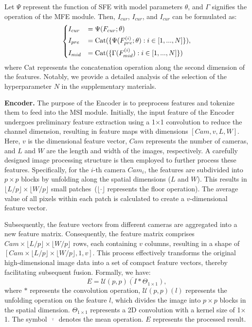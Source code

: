  
Let $\Psi$ represent the function of SFE with model parameters $\theta$, and $\Gamma$ signifies the operation of the MFE module. 
Then, $I_{cur}$, $I_{cur}$, and $I_{cur}$ can be formulated as:
\begin{equation}
\begin{dcases}
I_{cur} &= \Psi (F_{cur}; \theta)\\
I_{pre} &= \mathrm{Cat}(\{ \Psi (F_{pre}^{(i)}; \theta): i \in [1, ...,N]\}),\\
I_{mid} &= \mathrm{Cat}(\{ \Gamma(F_{mid}^{(i)}) : i \in [1, ...,N] \})\\
\end{dcases}
\end{equation}
where $\mathrm{Cat}$ represents the concatenation operation along the second dimension of the features. Notably, we provide a detailed analysis of the selection of the hyperparameter $N$ in the supplementary materials.


\noindent\textbf{Encoder.}
The purpose of the Encoder is to preprocess features and tokenize them to feed into the MSI module. Initially, the input feature of the Encoder undergoes preliminary feature extraction using a 1$\times$1 convolution to reduce the channel dimension, resulting in feature maps with dimensions $[Cam, v, L, W]$. Here, $v$ is the dimensional feature vector, $Cam$ represents the number of cameras, and $L$ and $W$ are the length and width of the images, respectively. A carefully designed image processing structure is then employed to further process these features. Specifically, for the $i$-th camera $Cam_i$, the features are subdivided into $p\times p$ blocks by unfolding along the spatial dimensions ($L$ and $W$). This results in $\lfloor L/p \rfloor \times \lfloor W/p \rfloor$ small patches~($\lfloor \cdot \rfloor$ represents the floor operation). The average value of all pixels within each patch is calculated to create a $v$-dimensional feature vector.

Subsequently, the feature vectors from different cameras are aggregated into a new feature matrix. Consequently, the feature matrix comprises $Cam \times \lfloor L/p \rfloor \times \lfloor W/p \rfloor$ rows, each containing $v$ columns, resulting in a shape of $[Cam \times \lfloor L/p \rfloor \times \lfloor W/p \rfloor, 1, v]$. This process effectively transforms the original high-dimensional image data into a set of compact feature vectors, thereby facilitating subsequent fusion. Formally, we have:
\begin{equation}
E = \overline{\mathcal{U}(p, p)(I\ast \Theta_{1\times1})}, 
\label{eq:qkv-process}
\end{equation}
where $\ast$ represents the convolution operation, $\mathcal{U}(p, p)(l)$ represents the unfolding operation on the feature $l$, which divides the image into $p\times p$ blocks in the spatial dimension. $\Theta_{1\times1}$ represents a 2D convolution with a kernel size of 1$\times$1. The symbol $\overline{~ \cdot ~ }$ denotes the mean operation. $E$ represents the processed result.

